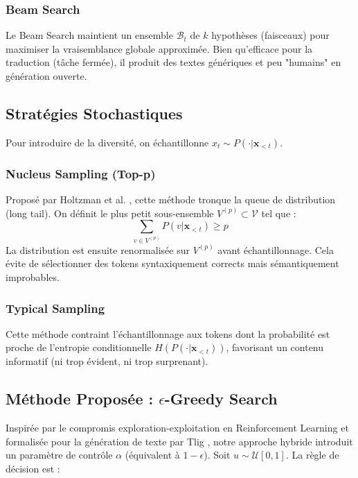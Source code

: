 \documentclass[12pt,a4paper]{article}
\newcommand{\vocab}{\mathcal{V}}
\begin{document}
\subsubsection{Beam Search}
Le Beam Search maintient un ensemble $\mathcal{B}_t$ de $k$ hypothèses (faisceaux) pour maximiser la vraisemblance globale approximée. Bien qu'efficace pour la traduction (tâche fermée), il produit des textes génériques et peu "humains" en génération ouverte.

\subsection{Stratégies Stochastiques}
Pour introduire de la diversité, on échantillonne $x_t \sim P(\cdot | \mathbf{x}_{<t})$.

\subsubsection{Nucleus Sampling (Top-p)}
Proposé par Holtzman et al. \cite{holtzman2019curious}, cette méthode tronque la queue de distribution (long tail). On définit le plus petit sous-ensemble $V^{(p)} \subset \vocab$ tel que :
\begin{equation}
    \sum_{v \in V^{(p)}} P(v | \mathbf{x}_{<t}) \ge p
\end{equation}
La distribution est ensuite renormalisée sur $V^{(p)}$ avant échantillonnage. Cela évite de sélectionner des tokens syntaxiquement corrects mais sémantiquement improbables.

\subsubsection{Typical Sampling}
Cette méthode \cite{meister2022typical} contraint l'échantillonnage aux tokens dont la probabilité est proche de l'entropie conditionnelle $H(P(\cdot|\mathbf{x}_{<t}))$, favorisant un contenu informatif (ni trop évident, ni trop surprenant).

\subsection{M\'ethode Propos\'ee : $\epsilon$-Greedy Search}
Inspir\'ee par le compromis exploration-exploitation en Reinforcement Learning et formalis\'ee pour la g\'en\'eration de texte par Tlig \cite{tlig2025epsilon}, notre approche hybride introduit un param\`etre de contr\^ole $\alpha$ (\'equivalent \`a $1-\epsilon$). Soit $u \sim \mathcal{U}[0, 1]$. La r\`egle de d\'ecision est :
\end{document}
